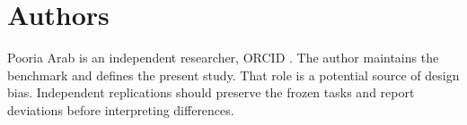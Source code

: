 \documentclass{article}
\begin{document}
\section{Authors}
Pooria Arab is an independent researcher, ORCID \AuthorOrcid{}. The author maintains the benchmark and defines the present study. That role is a potential source of design bias. Independent replications should preserve the frozen tasks and report deviations before interpreting differences.\par


\end{document}
